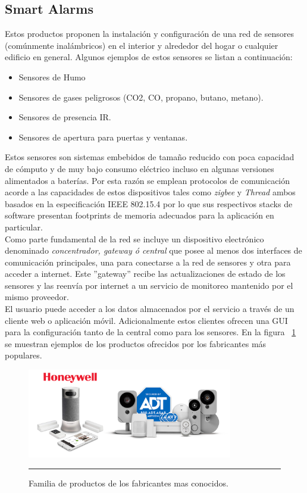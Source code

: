 \subsection{Smart Alarms}
Estos productos proponen la instalación y configuración de una red de sensores (comúnmente inalámbricos) en el interior y alrededor del hogar o cualquier edificio en general. Algunos ejemplos de estos sensores se listan a continuación:
\begin{itemize}
	\item Sensores de Humo
	\item Sensores de gases peligrosos (CO2, CO, propano, butano, metano).
	\item Sensores de presencia IR.
	\item Sensores de apertura para puertas y ventanas.
\end{itemize} 
Estos sensores son sistemas embebidos de tamaño reducido con poca capacidad de cómputo y de muy bajo consumo eléctrico incluso en algunas versiones alimentados a baterías.
Por esta razón se emplean protocolos de comunicación acorde a las capacidades de estos dispositivos tales como \textit{zigbee} y \textit{Thread} ambos basados en la especificación IEEE 802.15.4 por lo que sus respectivos stacks de software presentan footprints de memoria adecuados para la aplicación en particular.\\
Como parte fundamental de la red se incluye un dispositivo electrónico denominado \textit{concentrador, gateway ó central} que posee al menos dos interfaces de comunicación principales, una para conectarse a la red de sensores y otra para acceder a internet. Este ''gateway'' recibe las actualizaciones de estado de los sensores y las reenvía por internet a un servicio de monitoreo mantenido por el mismo proveedor.\\
El usuario puede acceder a los datos almacenados por el servicio a través de un cliente web o aplicación móvil.
Adicionalmente estos clientes ofrecen una GUI para la configuración tanto de la central como para los sensores.
En la figura ~\ref{fig:smartalarms} se muestran ejemplos de los productos ofrecidos por los fabricantes más populares.

\begin{figure}[htbp]
	\centering
	\includegraphics[width=0.8\textwidth]{Pictures/smartalarms.png}
	\rule{35em}{1pt}
	\caption[Smart Alarms]{Familia de productos de los fabricantes mas conocidos.}
	\label{fig:smartalarms}
\end{figure}

